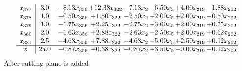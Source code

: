 \documentclass[8pt]{article}
\begin{document}
\[\begin{array}{c| c c@{\hskip 2pt} c@{\hskip 2pt} c@{\hskip 2pt} c@{\hskip 2pt} c@{\hskip 2pt} c@{\hskip 2pt} }
 x_{377}   &  3.0 & -8.13 x_{356} & + 12.38 x_{322} & -7.13 x_{2} & -6.50 x_{5} & +  4.00 x_{219} & -1.88 x_{202}\\
 x_{378}   &  1.0 & -0.50 x_{356} & +  1.50 x_{322} & -2.50 x_{2} & -2.00 x_{5} & +  2.00 x_{219} & -0.50 x_{202}\\
 x_{379}   &  1.0 & -1.75 x_{356} & +  2.25 x_{322} & -2.75 x_{2} & -3.00 x_{5} & +  2.00 x_{219} & +  0.75 x_{202}\\
 x_{380}   &  2.0 & -1.63 x_{356} & +  2.88 x_{322} & -2.63 x_{2} & -2.50 x_{5} & +  2.00 x_{219} & +  0.62 x_{202}\\
 x_{381}   &  2.5 & -4.63 x_{356} & +  7.88 x_{322} & -4.63 x_{2} & -5.00 x_{5} & +  2.50 x_{219} & +  0.12 x_{202}\\
\hline
z    &  25.0 & -0.87 x_{356} & -0.38 x_{322} & -0.87 x_{2} & -3.50 x_{5} & -0.00 x_{219} & -0.12 x_{202}\\
\end{array}\]
 After cutting plane is added 
\end{document}
